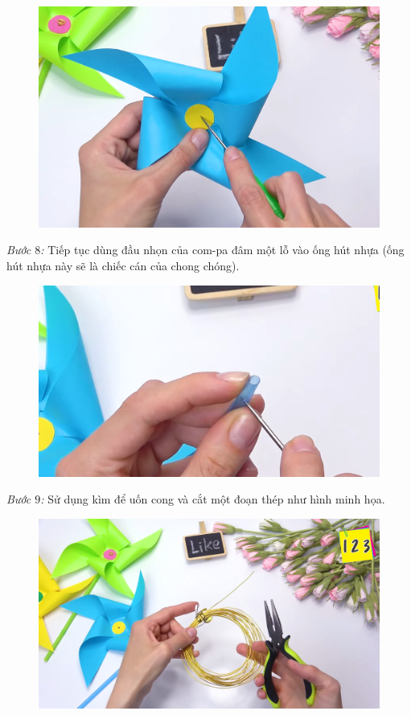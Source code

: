 \begin{multicols}{2}
\begin{figure}[H]
		\vspace*{-5pt}
		\centering
		\captionsetup{labelformat= empty, justification=centering}
		\includegraphics[width= 0.75\linewidth]{7}
		\vspace*{-10pt}
	\end{figure}
	\textit{Bước $8$:} Tiếp tục dùng đầu nhọn của com-pa đâm một lỗ vào ống hút nhựa (ống hút nhựa này sẽ là chiếc cán của chong chóng).
	\begin{figure}[H]
		\vspace*{-5pt}
		\centering
		\captionsetup{labelformat= empty, justification=centering}
		\includegraphics[width= 0.75\linewidth]{8}
		\vspace*{-10pt}
	\end{figure}
	\columnbreak
	\textit{Bước $9$:} Sử dụng kìm để uốn cong và cắt một đoạn thép như hình minh họa.
	\begin{figure}[H]
		\vspace*{-5pt}
		\centering
		\captionsetup{labelformat= empty, justification=centering}
		\includegraphics[width= 0.75\linewidth]{9a}

\end{figure}
\end{multicols}
